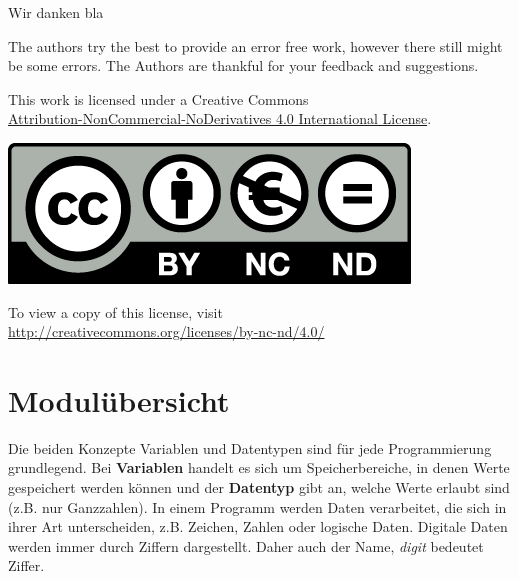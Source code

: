 \documentclass[12pt,a4paper, twoside=false]{scrartcl}
\begin{document}
\begin{titlepage}
\begin{center}
	\vspace{0.5 cm}  Wir danken bla

	\vspace{0.5 cm}
    The authors try the best to provide an error free work, however there still might be some errors. The Authors are thankful for your feedback and suggestions.
    \vfill
   	\end{center}

    \begin{center}
          This work is licensed under a Creative Commons \\
          \href{http://creativecommons.org/licenses/by-nc-nd/4.0/}{Attribution-NonCommercial-NoDerivatives 4.0 International License}.\\
      \end{center}
      \begin{center}
        \href{http://creativecommons.org/licenses/by-nc-nd/4.0/}{\includegraphics[scale=0.25]{figures/by-nc-nd_eu.png}}
      \end{center}
      \begin{center}
          To view a copy of this license, visit\\
          \href{http://creativecommons.org/licenses/by-nc-nd/4.0/}{http://creativecommons.org/licenses/by-nc-nd/4.0/}\\
    \end{center}

\end{titlepage}




\section{Modulübersicht}\label{modulubersicht}

Die beiden Konzepte Variablen und Datentypen sind für jede
Programmierung grundlegend. Bei \textbf{Variablen} handelt es sich um
Speicherbereiche, in denen Werte gespeichert werden können und der
\textbf{Datentyp} gibt an, welche Werte erlaubt sind (z.B. nur
Ganzzahlen). In einem Programm werden Daten verarbeitet, die sich in
ihrer Art unterscheiden, z.B. Zeichen, Zahlen oder logische Daten.
Digitale Daten werden immer durch Ziffern dargestellt. Daher auch der
Name, \emph{digit} bedeutet Ziffer.
\end{document}
